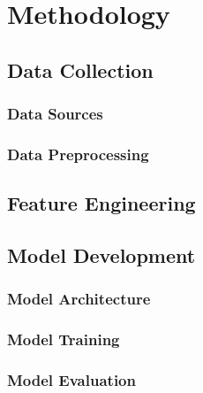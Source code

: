 \section*{Methodology}

\subsection{Data Collection}
\label{sec:Data Collection}

\subsubsection{Data Sources}
\label{sec:Data Sources}

\subsubsection{Data Preprocessing}
\label{sec:Data Preprocessing}

\subsection{Feature Engineering}
\label{sec:Feature Engineering}

\subsection{Model Development}
\label{sec:Model Development}

\subsubsection{Model Architecture}
\label{sec:Model Architecture}

\subsubsection{Model Training}
\label{sec:Model Training}

\subsubsection{Model Evaluation}
\label{sec:Model Evaluation}
